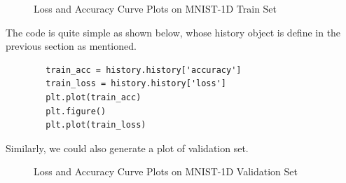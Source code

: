 \documentclass[conference]{IEEEtran}
\begin{document}
	\begin{figure}[h]
		\centering  %
		
		\caption{Loss and Accuracy Curve Plots on MNIST-1D Train Set}
		\label{Fig.la}
	\end{figure}
	
	The code is quite simple as shown below, whose history object is define in the previous section as mentioned. 
	
	\begin{lstlisting}
		train_acc = history.history['accuracy']
		train_loss = history.history['loss']
		plt.plot(train_acc)
		plt.figure()
		plt.plot(train_loss)
	\end{lstlisting}

	Similarly, we could also generate a plot of validation set.

	\begin{figure}[h]
		\centering  %
		
		\caption{Loss and Accuracy Curve Plots on MNIST-1D Validation Set}
		\label{Fig.laa}
	\end{figure}
	
\end{document}
